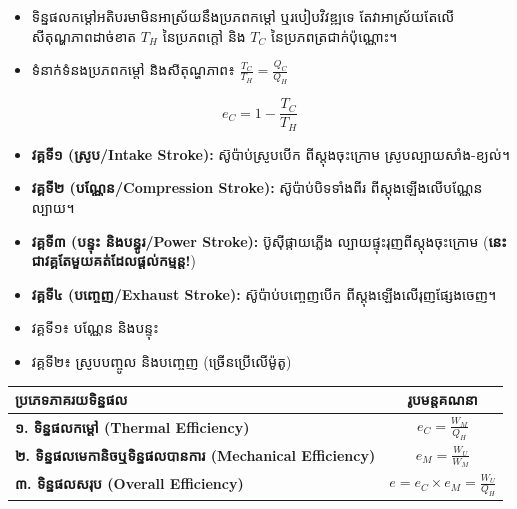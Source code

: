 \begin{itemize}
\item ទិន្នផលកម្ដៅអតិបរមាមិនអាស្រ័យនឹងប្រភពកម្ដៅ ឬរបៀបវិវឌ្ឍទេ តែវាអាស្រ័យតែលើសីតុណ្ហភាពដាច់ខាត $T_H$ នៃប្រភពក្ដៅ និង $T_C$ នៃប្រភពត្រជាក់ប៉ុណ្ណោះ។
\item ទំនាក់ទំនងប្រភពកម្ដៅ និងសីតុណ្ហភាព៖ $\frac{T_C}{T_H} = \frac{Q_C}{Q_H}$
\end{itemize}
\begin{equation}
e_C = 1 - \frac{T_C}{T_H}
\end{equation}



\begin{itemize}
\item \textbf{វគ្គទី១ (ស្រូប/{\englishfont Intake Stroke}):} ស៊ូប៉ាប់ស្រូបបើក ពីស្តុងចុះក្រោម ស្រូបល្បាយសាំង-ខ្យល់។
\item \textbf{វគ្គទី២ (បណ្ណែន/{\englishfont Compression Stroke}):} ស៊ូប៉ាប់បិទទាំងពីរ ពីស្តុងឡើងលើបណ្ណែនល្បាយ។
\item \textbf{វគ្គទី៣ (បន្ទុះ និងបន្ធូរ/{\englishfont Power Stroke}):} ប៊ូស៊ីផ្កាយភ្លើង ល្បាយផ្ទុះរុញពីស្តុងចុះក្រោម (\textbf{នេះជាវគ្គតែមួយគត់ដែលផ្ដល់កម្មន្ត!})
\item \textbf{វគ្គទី៤ (បញ្ចេញ/{\englishfont Exhaust Stroke}):} ស៊ូប៉ាប់បញ្ចេញបើក ពីស្តុងឡើងលើរុញផ្សែងចេញ។
\end{itemize}

\begin{itemize}
\item វគ្គទី១៖ បណ្ណែន និងបន្ទុះ
\item វគ្គទី២៖ ស្រូបបញ្ចូល និងបញ្ចេញ (ច្រើនប្រើលើម៉ូតូ)
\end{itemize}


\begin{center}
\renewcommand{\arraystretch}{1.8}
\begin{tabular}{|l|c|}
	\hline
	\textcolor{brownheader}{\textbf{{\khmerpagenum ប្រភេទភាគរយទិន្នផល}}} & \textcolor{brownheader}{\textbf{{\khmerpagenum រូបមន្តគណនា}}} \\
	\hline
	\textbf{១. ទិន្នផលកម្ដៅ {\englishfont (Thermal Efficiency)}} & $e_C = \frac{W_M}{Q_H}$ \\
	\hline
	\textbf{២. ទិន្នផលមេកានិចឬទិន្នផលបានការ {\englishfont (Mechanical Efficiency)}} & $e_M = \frac{W_U}{W_M}$ \\
	\hline
	\textbf{៣. ទិន្នផលសរុប {\englishfont (Overall Efficiency)}} & $e = e_C \times e_M = \frac{W_U}{Q_H}$ \\
	\hline
\end{tabular}
\end{center}

